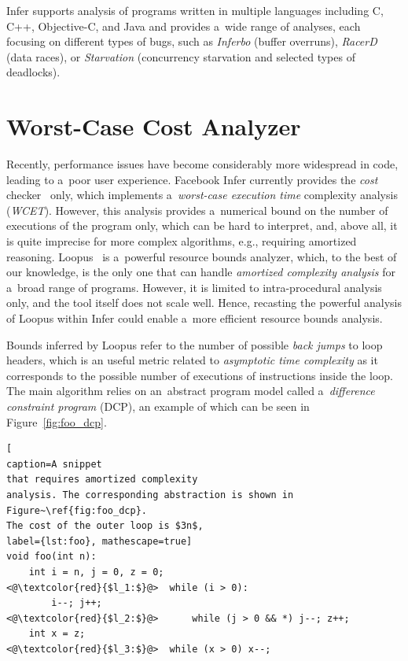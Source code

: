\documentclass{ExcelAtFIT}
\begin{document}
Infer supports analysis of programs written in multiple 
languages including C, C++, Objective-C, and Java and provides 
a~wide range of analyses, each focusing on different types of bugs,
such as \textit{Inferbo} (buffer overruns), 
\textit{RacerD}~\cite{racerd} (data races),
or \textit{Starvation} (concurrency starvation and
selected types of deadlocks).

\section{Worst-Case Cost Analyzer}
\label{sec:worst-case-analyzer}

Recently, performance issues have become
considerably more widespread in code, leading
to a~poor user experience.
Facebook Infer
currently provides the \emph{cost}
checker~\cite{cost-checker} only, which implements
a~\emph{worst-case execution time}
complexity analysis (\emph{WCET}). However, this
analysis provides a~numerical bound
on the number of executions of the program
only, which can be hard to interpret, and,
above all, it is quite imprecise for more complex
algorithms, e.g., requiring amortized reasoning.
Loopus~\cite{loopus-tool} is a~powerful resource
bounds analyzer, which, to the best of our knowledge,
is the only one that can handle
\emph{amortized complexity analysis} for a~broad
range of programs. However, it is limited to
intra-procedural analysis only, and the tool itself
does not scale well. Hence, recasting
the powerful analysis of Loopus within Infer
could enable a~more efficient resource bounds
analysis.

Bounds inferred by Loopus refer to the number
of possible \textit{back jumps} to loop headers, which
is an useful metric related to
\textit{asymptotic time complexity} as it corresponds
to the possible number of executions of instructions
inside the loop. The main algorithm relies on 
an~abstract program model called
a~\textit{difference constraint program} (DCP), an example
of which can be seen in Figure~\ref{fig:foo_dcp}.
\vspace{-1mm}  
\begin{lstlisting}[
caption=A snippet
that requires amortized complexity
analysis. The corresponding abstraction is shown in
Figure~\ref{fig:foo_dcp}. 
The cost of the outer loop is $3n$,
label={lst:foo}, mathescape=true]
void foo(int n):
    int i = n, j = 0, z = 0;
<@\textcolor{red}{$l_1:$}@>  while (i > 0):
        i--; j++;
<@\textcolor{red}{$l_2:$}@>      while (j > 0 && *) j--; z++;
    int x = z;
<@\textcolor{red}{$l_3:$}@>  while (x > 0) x--;
\end{lstlisting}
\end{document}
